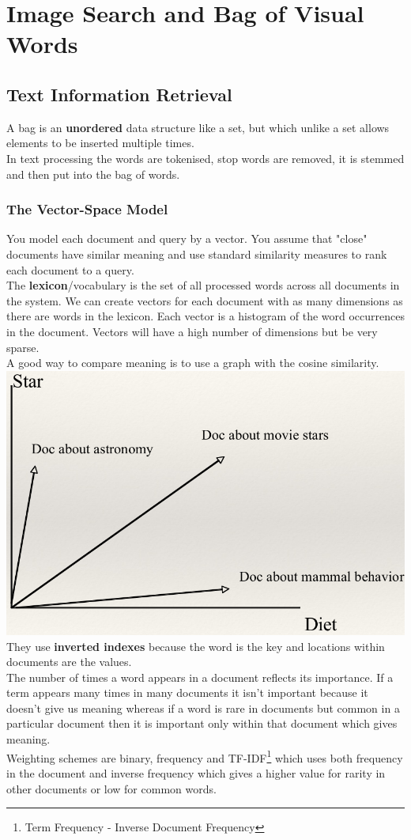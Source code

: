 \documentclass{article}
\begin{document}
	\section{Image Search and Bag of Visual Words}
	\subsection{Text Information Retrieval}
	A bag is an \textbf{unordered} data structure like a set, but which unlike a set allows elements to be inserted multiple times.\\
	In text processing the words are tokenised, stop words are removed, it is stemmed and then put into the bag of words.
	\subsubsection{The Vector-Space Model}
	You model each document and query by a vector. You assume that "close" documents have similar meaning and use standard similarity measures to rank each document to a query.\\
	The \textbf{lexicon}/vocabulary is the set of all processed words across all documents in the system. We can create vectors for each document with as many dimensions as there are words in the lexicon. Each vector is a histogram of the word occurrences in the document. Vectors will have a high number of dimensions but be very sparse.\\
	A good way to compare meaning is to use a graph with the cosine similarity.\\
	\includegraphics[width=\linewidth]{doc_meaning}
	They use \textbf{inverted indexes} because the word is the key and locations within documents are the values.\\
	The number of times a word appears in a document reflects its importance. If a term appears many times in many documents it isn't important because it doesn't give us meaning whereas if a word is rare in documents but common in a particular document then it is important only within that document which gives meaning.\\
	Weighting schemes are binary, frequency and TF-IDF\footnote{Term Frequency - Inverse Document Frequency} which uses both frequency in the document and inverse frequency which gives a higher value for rarity in other documents or low for common words.
\end{document}
